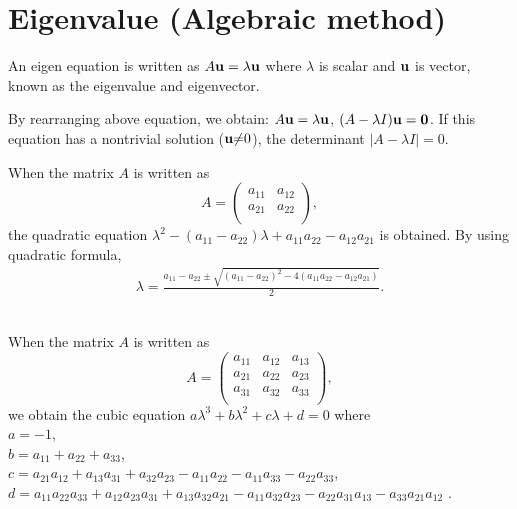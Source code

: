 \documentclass[dvipdfmx]{article}
\begin{document}
\section*{Eigenvalue (Algebraic method)}
An eigen equation is written as
$A{\bf{u}} = {\lambda}{\bf{u}}$ 
where ${\lambda}$ is scalar and ${\bf{u}}$ is vector, known as the eigenvalue and eigenvector.

By rearranging above equation, we obtain:  $A{\bf{u}} = {\lambda}{\bf{u}}$, $(A - {\lambda}I){\bf{u}} = {\bf{0}}$. 
If this equation has a nontrivial solution (${\bf{u}} {\neq} 0$),
the determinant $|A - {\lambda}I| = 0$.

\begin{flushleft}
\end{flushleft}
When the matrix $A$ is written as
 \[
   A=
   \left(
   \begin{array}{cc}
   a_{11} & a_{12}  \\
   a_{21} & a_{22} \\
   \end{array}
   \right) ,
  \]
the quadratic equation ${\lambda}^2 -(a_{11} - a_{22}){\lambda} + a_{11}a_{22} - a_{12}a_{21}$ is obtained.
By using quadratic formula, 
\begin{eqnarray}
{\lambda} =  \frac{ a_{11} -a_{22} {\pm} \sqrt{(a_{11}-a_{22})^2 - 4(a_{11}a_{22} - a_{12}a_{21})} }{2}. \nonumber
\end{eqnarray} \\

\begin{flushleft}
\end{flushleft}
When the matrix $A$ is written as
 \[
   A=
   \left(
   \begin{array}{ccc}
   a_{11} & a_{12} & a_{13} \\
   a_{21} & a_{22} & a_{23} \\
   a_{31} & a_{32} & a_{33} \\
   \end{array}
   \right) ,
  \]
we obtain the cubic equation $a{\lambda}^3 + b{\lambda}^2 + c{\lambda} + d = 0$  where \\
$a = -1$, \\
$b = a_{11} + a_{22} + a_{33}$, \\
$c = a_{21}a_{12} + a_{13}a_{31} + a_{32}a_{23} - a_{11}a_{22} - a_{11}a_{33} - a_{22}a_{33}$, \\
$d =  a_{11}a_{22}a_{33} + a_{12}a_{23}a_{31} + a_{13}a_{32}a_{21} - a_{11}a_{32}a_{23} - a_{22}a_{31}a_{13} - a_{33}a_{21}a_{12}$ . \\
\end{document}
